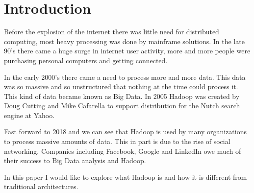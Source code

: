 \section{Introduction}
  
   Before the explosion of the internet there was little need for distributed computing, most heavy processing was done by mainframe solutions. In the late 90's there came a huge surge in internet user activity, more and more people were purchasing personal computers and getting connected.
   
In the early 2000's there came a need to process more and more data. This data was so massive and so unstructured that nothing at the time could process it. This kind of data became known as Big Data. In 2005 Hadoop was created by Doug Cutting and Mike Cafarella to support distribution for the Nutch search engine at Yahoo.

Fast forward to 2018 and we can see that Hadoop is used by many organizations to process massive amounts of data. This in part is due to the rise of social networking. Companies including Facebook, Google and LinkedIn owe much of their success to Big Data analysis and Hadoop.

In this paper I would like to explore what Hadoop is and how it is different from traditional architectures.